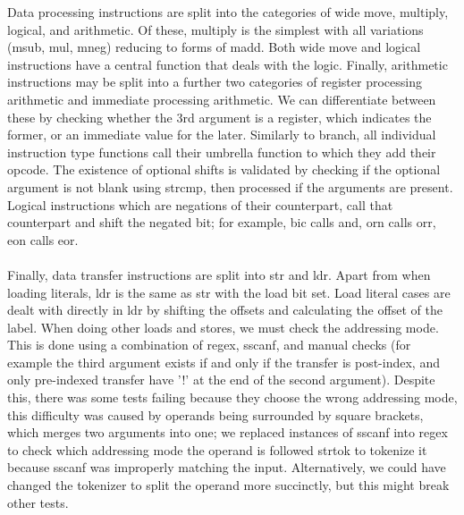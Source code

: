 \documentclass[11pt]{article}
\begin{document}
Data processing instructions are split into the categories of wide move, multiply, logical, and arithmetic. Of these, multiply is the simplest with all variations (msub, mul, mneg) reducing to forms of madd. Both wide move and logical instructions have a central function that deals with the logic. Finally, arithmetic instructions may be split into a further two categories of register processing arithmetic and immediate processing arithmetic. We can differentiate between these by checking whether the 3rd argument is a register, which indicates the former, or an immediate value for the later. Similarly to branch, all individual instruction type functions call their umbrella function to which they add their opcode. The existence of optional shifts is validated by checking if the optional argument is not blank using strcmp, then processed if the arguments are present. Logical instructions which are negations of their counterpart, call that counterpart and shift the negated bit; for example, bic calls and, orn calls orr, eon calls eor. \\\\
Finally, data transfer instructions are split into str and ldr. Apart from when loading literals, ldr is the same as str with the load bit set. Load literal cases are dealt with directly in ldr by shifting the offsets and calculating the offset of the label. When doing other loads and stores, we must check the addressing mode.  This is done using a combination of regex, sscanf, and manual checks (for example the third argument exists if and only if the transfer is post-index, and only pre-indexed transfer have '!' at the end of the second argument). Despite this, there was some tests failing because they choose the wrong addressing mode, this difficulty was caused by operands being surrounded by square brackets, which merges two arguments into one; we replaced instances of sscanf into regex to check which addressing mode the operand is followed strtok to tokenize it because sscanf was improperly matching the input. Alternatively, we could have changed the tokenizer to split the operand more succinctly, but this might break other tests.
\end{document}
